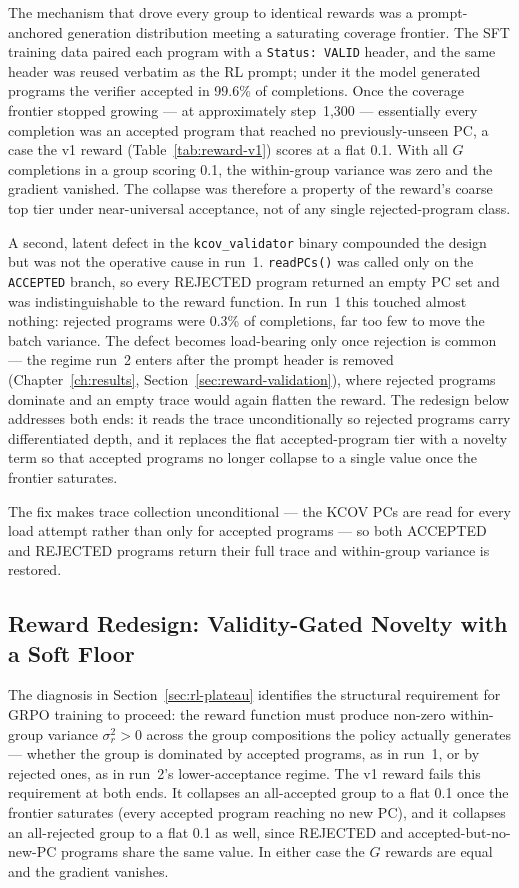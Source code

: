 The mechanism that drove every group to identical rewards was a prompt-anchored
generation distribution meeting a saturating coverage frontier.
The SFT training data paired each program with a \texttt{Status:~VALID} header, and
the same header was reused verbatim as the RL prompt; under it the model generated
programs the verifier accepted in 99.6\% of completions.
Once the coverage frontier stopped growing --- at approximately step~1,300 ---
essentially every completion was an accepted program that reached no
previously-unseen PC, a case the v1 reward (Table~\ref{tab:reward-v1}) scores at a
flat 0.1.
With all $G$ completions in a group scoring 0.1, the within-group variance was zero
and the gradient vanished.
The collapse was therefore a property of the reward's coarse top tier under
near-universal acceptance, not of any single rejected-program class.

A second, latent defect in the \texttt{kcov\_validator} binary compounded the
design but was not the operative cause in run~1.
\texttt{readPCs()} was called only on the \texttt{ACCEPTED} branch, so every
REJECTED program returned an empty PC set and was indistinguishable to the reward
function.
In run~1 this touched almost nothing: rejected programs were 0.3\% of completions,
far too few to move the batch variance.
The defect becomes load-bearing only once rejection is common --- the regime run~2
enters after the prompt header is removed
(Chapter~\ref{ch:results}, Section~\ref{sec:reward-validation}), where rejected
programs dominate and an empty trace would again flatten the reward.
The redesign below addresses both ends: it reads the trace unconditionally so
rejected programs carry differentiated depth, and it replaces the flat
accepted-program tier with a novelty term so that accepted programs no longer
collapse to a single value once the frontier saturates.

The fix makes trace collection unconditional --- the KCOV PCs are read for every
load attempt rather than only for accepted programs --- so both ACCEPTED and
REJECTED programs return their full trace and within-group variance is restored.

\subsection{Reward Redesign: Validity-Gated Novelty with a Soft Floor}
\label{sec:reward-redesign}

The diagnosis in Section~\ref{sec:rl-plateau} identifies the structural
requirement for GRPO training to proceed: the reward function must produce
non-zero within-group variance $\sigma_r^2 > 0$ across the group compositions the
policy actually generates --- whether the group is dominated by accepted programs,
as in run~1, or by rejected ones, as in run~2's lower-acceptance regime.
The v1 reward fails this requirement at both ends.
It collapses an all-accepted group to a flat 0.1 once the frontier saturates
(every accepted program reaching no new PC), and it collapses an all-rejected group
to a flat 0.1 as well, since REJECTED and accepted-but-no-new-PC programs share the
same value.
In either case the $G$ rewards are equal and the gradient vanishes.

